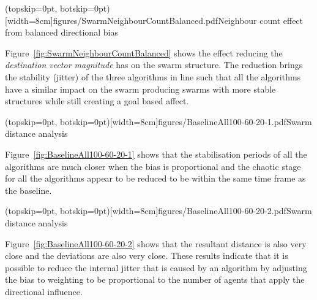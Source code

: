 \documentclass{ieeeaccess}
\begin{document}

\Figure[t!](topskip=0pt, botskip=0pt)[width=8cm]{figures/SwarmNeighbourCountBalanced.pdf}{Neighbour count effect from balanced directional bias\label{fig:SwarmNeighbourCountBalanced}}

Figure~\ref{fig:SwarmNeighbourCountBalanced} shows the effect reducing the \textit{destination vector magnitude} has on the swarm structure. The reduction brings the stability (jitter) of the three algorithms in line such that all the algorithms have a similar impact on the swarm producing swarms with more stable structures while still creating a goal based affect. 


\Figure[t!](topskip=0pt, botskip=0pt)[width=8cm]{figures/BaselineAll100-60-20-1.pdf}{Swarm distance analysis\label{fig:BaselineAll100-60-20-1}}

Figure~\ref{fig:BaselineAll100-60-20-1} shows that the stabilisation periods of all the algorithms are much closer when the bias is proportional and the chaotic stage for all the algorithms appear to be reduced to be within the same time frame as the baseline.


\Figure[t!](topskip=0pt, botskip=0pt)[width=8cm]{figures/BaselineAll100-60-20-2.pdf}{Swarm distance analysis\label{fig:BaselineAll100-60-20-2}}

Figure~\ref{fig:BaselineAll100-60-20-2} shows that the resultant distance is also very close and the deviations are also very close. These results indicate that it is possible to reduce the internal jitter that is caused by an algorithm by adjusting the bias to weighting to be proportional to the number of agents that apply the directional influence.
\end{document}
